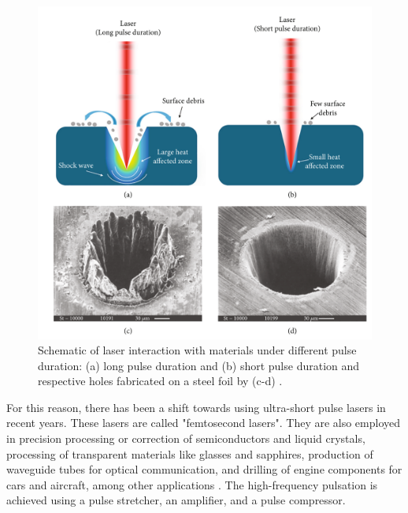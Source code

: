\begin{figure}
    \centering
    \includegraphics[scale=0.35]{Images/laserpulsing.png}
    \caption[Laser interactions with different pulses.]{Schematic of laser interaction with materials under different pulse duration: (a) long pulse duration and (b) short pulse duration and respective holes fabricated on a steel foil by (c-d) \cite{lin_femtosecond_2021}.}
    \label{fig:pulsipulsiocomepulsi}
\end{figure}
For this reason, there has been a shift towards using ultra-short pulse lasers in recent years. These lasers are called "femtosecond lasers". They are also employed in precision processing or correction of semiconductors and liquid crystals, processing of transparent materials like glasses and sapphires, production of waveguide tubes for optical communication, and drilling of engine components for cars and aircraft, among other applications \cite{katayama_fundamentals_2020}. The high-frequency pulsation is achieved using a pulse stretcher, an amplifier, and a pulse compressor.
